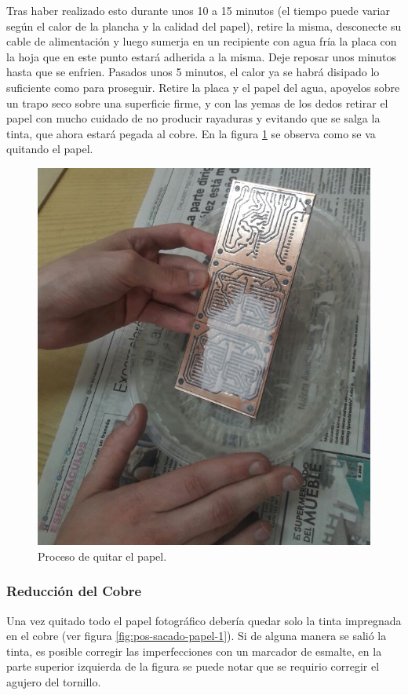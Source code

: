 Tras haber realizado esto durante unos 10 a 15 minutos (el tiempo puede variar según el calor de la plancha y la calidad del papel), retire la misma, desconecte su cable de alimentación y luego sumerja en un recipiente con agua fría la placa con la hoja que en este punto estará adherida a la misma. Deje reposar unos minutos hasta que se enfrien. Pasados unos 5 minutos, el calor ya se habrá disipado lo suficiente como para proseguir. Retire la placa y el papel del agua, apoyelos sobre un trapo seco sobre una superficie firme, y con las yemas de los dedos retirar el papel con mucho cuidado de no producir rayaduras y evitando que se salga la tinta, que ahora estará pegada al cobre.
En la figura \ref{fig:sacado-papel} se observa como se va quitando el papel.

\begin{figure}[ht!]
	\centering
	\includegraphics[width=0.6\linewidth]{imagenes/pcbeando/sacado-papel-1.png}
	\caption{Proceso de quitar el papel.}
	\label{fig:sacado-papel}
\end{figure}

\subsubsection{Reducción del Cobre}
Una vez quitado todo el papel fotográfico debería quedar solo la tinta impregnada en el cobre (ver figura \ref{fig:pos-sacado-papel-1}). Si de alguna manera se salió la tinta, es posible corregir las imperfecciones con un marcador de esmalte, en la parte superior izquierda de la figura se puede notar que se requirio corregir el agujero del tornillo.

